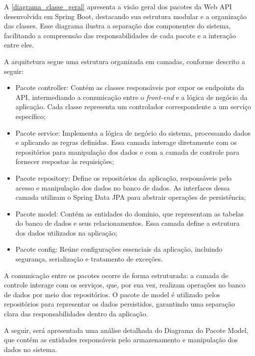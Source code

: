 \documentclass[
	12pt,				%
	oneside,			%
	a4paper,			%
	english,			%
	french,				%
	spanish,			%
	brazil				%
	]{abntex2}
\begin{document}
A \autoref{diagrama_classe_geral} apresenta a visão geral dos pacotes da
Web API desenvolvida em Spring Boot, destacando sua estrutura modular e
a organização das classes. Esse diagrama ilustra a separação dos
componentes do sistema, facilitando a compreensão das responsabilidades
de cada pacote e a interação entre eles.

A arquitetura segue uma estrutura organizada em camadas, conforme
descrito a seguir:

\begin{itemize}
\tightlist
\item
  Pacote controller: Contém as classes responsáveis por expor os
  endpoints da API, intermediando a comunicação entre o \emph{front-end}
  e a lógica de negócio da aplicação. Cada classe representa um
  controlador correspondente a um serviço específico;
\item
  Pacote service: Implementa a lógica de negócio do sistema, processando
  dados e aplicando as regras definidas. Essa camada interage
  diretamente com os repositórios para manipulação dos dados e com a
  camada de controle para fornecer respostas às requisições;
\item
  Pacote repository: Define os repositórios da aplicação, responsáveis
  pelo acesso e manipulação dos dados no banco de dados. As interfaces
  dessa camada utilizam o Spring Data JPA para abstrair operações de
  persistência;
\item
  Pacote model: Contém as entidades do domínio, que representam as
  tabelas do banco de dados e seus relacionamentos. Essa camada define a
  estrutura dos dados utilizados na aplicação;
\item
  Pacote config: Reúne configurações essenciais da aplicação, incluindo
  segurança, serialização e tratamento de exceções.
\end{itemize}

A comunicação entre os pacotes ocorre de forma estruturada: a camada de
controle interage com os serviços, que, por sua vez, realizam operações
no banco de dados por meio dos repositórios. O pacote de model é
utilizado pelos repositórios para representar os dados persistidos,
garantindo uma separação clara das responsabilidades dentro da
aplicação.

A seguir, será apresentada uma análise detalhada do Diagrama do Pacote
Model, que contém as entidades responsáveis pelo armazenamento e
manipulação dos dados no sistema.
\end{document}
